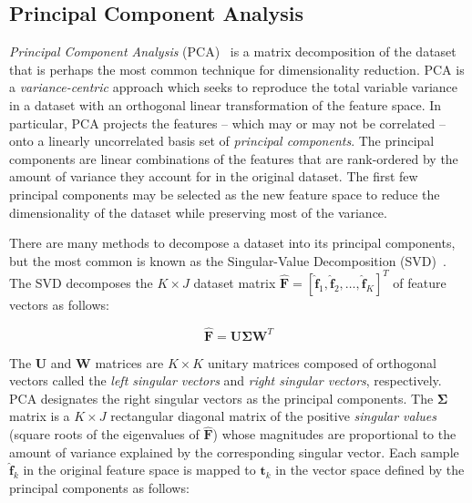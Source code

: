 \subsection{Principal Component Analysis}
\label{subsec:chap10-pca}

\textit{Principal Component Analysis} (PCA)~\cite{jolliffe2002pca} is a matrix decomposition of the dataset that is perhaps the most common technique for dimensionality reduction. PCA is a \textit{variance-centric} approach which seeks to reproduce the total variable variance in a dataset with an orthogonal linear transformation of the feature space. In particular, PCA projects the features -- which may or may not be correlated -- onto a linearly uncorrelated basis set of \textit{principal components}. The principal components are linear combinations of the features that are rank-ordered by the amount of variance they account for in the original dataset. The first few principal components may be selected as the new feature space to reduce the dimensionality of the dataset while preserving most of the variance.

There are many methods to decompose a dataset into its principal components, but the most common is known as the Singular-Value Decomposition (SVD)~\cite{golub1970svd}. The SVD decomposes the $K \times J$ dataset matrix $\boldsymbol{\hat{F}} = \left[\boldsymbol{\hat{f}}_{1}, \boldsymbol{\hat{f}}_{2}, \dots, \boldsymbol{\hat{f}}_{K}\right]^{T} $ of feature vectors as follows:


\begin{equation}
\label{eqn:chap10-svd}
\boldsymbol{\hat{F}} = \boldsymbol{U}\boldsymbol{\Sigma}\boldsymbol{W}^{T}
\end{equation}

\noindent The $\boldsymbol{U}$ and $\boldsymbol{W}$ matrices are $K \times K$ unitary matrices composed of orthogonal vectors called the \textit{left singular vectors} and \textit{right singular vectors}, respectively. PCA designates the right singular vectors as the principal components. The $\boldsymbol{\Sigma}$ matrix is a $K \times J$ rectangular diagonal matrix of the positive \textit{singular values} (square roots of the eigenvalues of $\boldsymbol{\hat{F}}$) whose magnitudes are proportional to the amount of variance explained by the corresponding singular vector. Each sample $\boldsymbol{\hat{f}}_{k}$ in the original feature space is mapped to $\boldsymbol{t}_{k}$ in the vector space defined by the principal components as follows:


